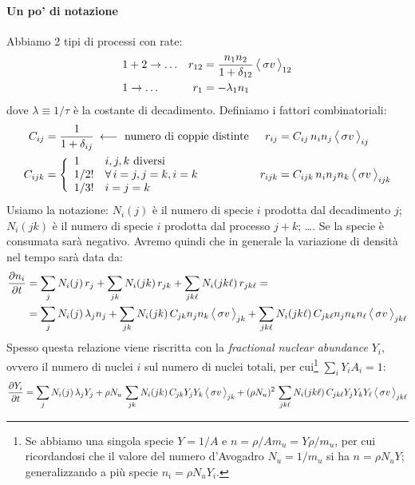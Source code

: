 \paragraph{Un po' di notazione} Abbiamo 2 tipi di processi con rate:
\begin{align*}
	&1+2 \to \dots	& r_{12} &= \frac{n_1n_2}{1+\delta_{12}}\,\bigl\langle\, \sigma v\, \bigr\rangle_{12} \\
	&1\to \dots	& r_1 &= -\lambda_1 n_1
\end{align*}
\noindent dove $\lambda \equiv 1/\tau$ è la costante di decadimento. Definiamo i fattori combinatoriali:
\begin{align*}
	C_{ij} &= \frac{1}{1+\delta_{ij}}\:\longleftarrow \text{ numero di coppie distinte} & r_{ij} &= C_{ij}\, n_in_j\,\mean{\sigma v}_{ij} \\ 
	C_{ijk} &= \Biggl \{%
	\begin{array}{ll}
		1    & i,j,k \text{ diversi}\\
		1/2! & \forall\, i=j, j=k, i=k \\ 
		1/3! & i=j=k
	\end{array}%
	& r_{ijk} &= C_{ijk}\, n_in_j n_k\,\mean{\sigma v}_{ijk}
\end{align*}
\noindent Usiamo la notazione:	$N_i(j)$ è il numero di specie $i$ prodotta dal decadimento $j$; $N_i(jk)$ è il numero di specie $i$ prodotta dal processo $j+k$; \dots. Se la specie è consumata sarà negativo. Avremo quindi che in generale la variazione di densità nel tempo sarà data da:
\begin{align*}
	\frac{\partial n_i}{\partial t} &= \sum_j N_i(j)\, r_j + \sum_{jk} N_i(jk)\, r_{jk} + \sum_{jk\ell} N_i(jk\ell)\, r_{jk\ell} = \\
	&= \sum_j N_i(j)\, \lambda_j n_j + \sum_{jk} N_i(jk)\, C_{jk}n_jn_k\, \bigl\langle\, \sigma v\, \bigr\rangle_{jk} + \sum_{jk\ell} N_i(jk\ell)\, C_{jk\ell}n_jn_kn_\ell\,\bigl\langle\, \sigma v\, \bigr\rangle_{jk\ell}    
\end{align*} 
\noindent Spesso questa relazione viene riscritta con la \textit{fractional nuclear abundance} $Y_i$, ovvero il numero di nuclei $i$ sul numero di nuclei totali, per cui\footnote{Se abbiamo una singola specie $Y=1/A$ e $n = \rho/Am_u = Y\rho/m_u$, per cui ricordandosi che il valore del numero d'Avogadro $N_u = 1/m_u$ si ha $n=\rho N_u Y$; generalizzando a più specie $n_i = \rho N_u Y_i$.} $\sum_i Y_i A_i = 1$:
$$\frac{\partial Y_i}{\partial t} = \sum_j N_i(j)\, \lambda_j Y_j + \rho N_u\, \sum_{jk} N_i(jk)\, C_{jk}Y_jY_k\, \bigl\langle\, \sigma v\, \bigr\rangle_{jk} + (\rho N_u)^2\,\sum_{jk\ell} N_i(jk\ell)\, C_{jk\ell}Y_jY_kY_\ell\,\bigl\langle\, \sigma v\, \bigr\rangle_{jk\ell} $$

